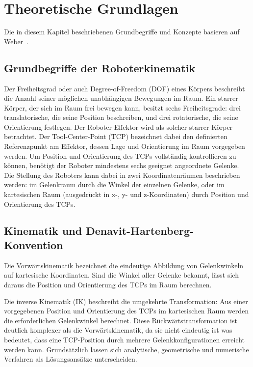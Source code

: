 \documentclass[12pt,a4paper]{article}
\begin{document}
\newpage
\section{Theoretische Grundlagen}

Die in diesem Kapitel beschriebenen Grundbegriffe und Konzepte basieren auf Weber~\cite{Weber.2017}.

\subsection{Grundbegriffe der Roboterkinematik}
Der Freiheitsgrad oder auch Degree-of-Freedom (DOF) eines Körpers beschreibt die Anzahl seiner möglichen unabhängigen Bewegungen im  Raum. Ein starrer Körper, der sich im Raum frei bewegen kann, besitzt sechs Freiheitsgrade: drei translatorische, die seine Position beschreiben, und drei rotatorische, die seine Orientierung festlegen. Der Roboter-Effektor wird als solcher starrer Körper betrachtet. Der Tool-Center-Point (TCP) bezeichnet dabei den definierten Referenzpunkt am Effektor, dessen Lage und Orientierung im Raum vorgegeben werden. Um Position und Orientierung des TCPs vollständig kontrollieren zu können, benötigt der Roboter mindestens sechs geeignet angeordnete Gelenke. Die Stellung des Roboters kann dabei in zwei Koordinatenräumen beschrieben werden: im Gelenkraum durch die Winkel der einzelnen Gelenke, oder im kartesischen Raum (ausgedrückt in x-, y- und z-Koordinaten) durch Position und Orientierung des TCPs.

\subsection{Kinematik und Denavit-Hartenberg-Konvention}

Die Vorwärtskinematik bezeichnet die eindeutige Abbildung von Gelenkwinkeln auf kartesische  Koordinaten. Sind die Winkel aller Gelenke bekannt, lässt sich daraus die Position und Orientierung des TCPs im Raum berechnen.

Die inverse Kinematik (IK) beschreibt die umgekehrte Transformation: Aus einer vorgegebenen Position und Orientierung des TCPs im kartesischen Raum werden die erforderlichen Gelenkwinkel berechnet. Diese Rückwärtstransformation ist deutlich komplexer als die Vorwärtskinematik, da sie nicht eindeutig ist was bedeutet, dass eine TCP-Position durch mehrere Gelenkkonfigurationen erreicht werden kann. Grundsätzlich lassen sich analytische, geometrische und numerische Verfahren als Lösungsansätze unterscheiden.
\end{document}

